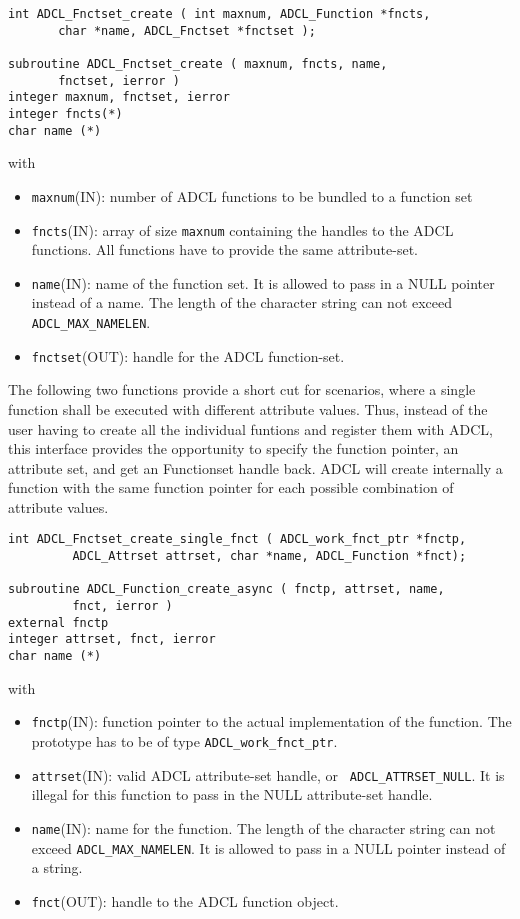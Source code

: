 \hspace{1cm}
\begin{verbatim}
int ADCL_Fnctset_create ( int maxnum, ADCL_Function *fncts, 
       char *name, ADCL_Fnctset *fnctset );

subroutine ADCL_Fnctset_create ( maxnum, fncts, name, 
       fnctset, ierror )
integer maxnum, fnctset, ierror
integer fncts(*)
char name (*)
\end{verbatim}
with
\begin{itemize}
\item {\tt maxnum}(IN): number of ADCL functions to be bundled to a function set
\item {\tt fncts}(IN): array of size {\tt maxnum} containing the handles to
  the ADCL functions. All functions have to provide the same attribute-set.
\item {\tt name}(IN): name of the function set. It is allowed to pass in a
  NULL pointer instead of a name. The length of the character string can not
  exceed {\tt ADCL\_MAX\_NAMELEN}.
\item {\tt fnctset}(OUT): handle for the ADCL function-set.
\end{itemize}


The following two functions provide a short cut for scenarios, where a single function
shall be executed with different attribute values. Thus, instead of the user
having to create all the individual funtions and register them with ADCL, this
interface provides the opportunity to specify the function pointer, an
attribute set, and get an Functionset handle back. ADCL will create internally
a function with the same function pointer for each possible combination of
attribute values.

\begin{verbatim}
int ADCL_Fnctset_create_single_fnct ( ADCL_work_fnct_ptr *fnctp, 
         ADCL_Attrset attrset, char *name, ADCL_Function *fnct);

subroutine ADCL_Function_create_async ( fnctp, attrset, name, 
         fnct, ierror )
external fnctp
integer attrset, fnct, ierror
char name (*)	  
\end{verbatim}
with
\begin{itemize}
\item {\tt fnctp}(IN): function pointer to the actual implementation of the function. The prototype has
     to be of type {\tt ADCL\_work\_fnct\_ptr}.
\item {\tt attrset}(IN): valid ADCL attribute-set handle, or {\tt
    ADCL\_ATTRSET\_NULL}. It is illegal for this function to pass in the NULL attribute-set 
    handle.
\item {\tt name}(IN): name for the function. The length of the character string can not exceed 
  {\tt ADCL\_MAX\_NAMELEN}. It is allowed to pass in a NULL pointer instead of a string.
\item {\tt fnct}(OUT): handle to the ADCL function object.
\end{itemize}

